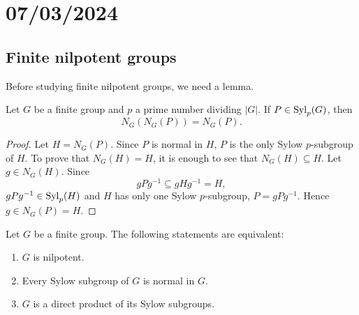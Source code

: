 \section{07/03/2024}


\subsection{Finite nilpotent groups}

Before studying finite nilpotent groups, we need a lemma. 

\begin{lemma}
\label{lem:normalizador}
Let $G$ be a finite group and $p$ a prime number dividing $|G|$. 
If 
$P\in\mathrm{Syl}_p(G)$, then 
\[
N_G(N_G(P))=N_G(P). 
\]
\end{lemma}

\begin{proof}
Let $H=N_G(P)$. Since $P$ is normal in $H$, $P$ is the only Sylow $p$-subgroup of $H$. 
To prove that $N_G(H)=H$, it is enough to see that $N_G(H)\subseteq
H$. Let $g\in N_G(H)$. Since  
\[
gPg^{-1}\subseteq gHg^{-1}=H,
\]
$gPg^{-1}\in\mathrm{Syl}_p(H)$ and $H$ has only one Sylow $p$-subgroup, 
$P=gPg^{-1}$.  Hence $g\in N_G(P)=H$. 
\end{proof}

\begin{theorem}
\label{thm:nilpotent:eq}
Let $G$ be a finite group. The following statements are equivalent:
\begin{enumerate}
	\item $G$ is nilpotent. 
	\item Every Sylow subgroup of $G$ is normal in $G$. 
	\item $G$ is a direct product of its Sylow subgroups. 
\end{enumerate}
\end{theorem}


